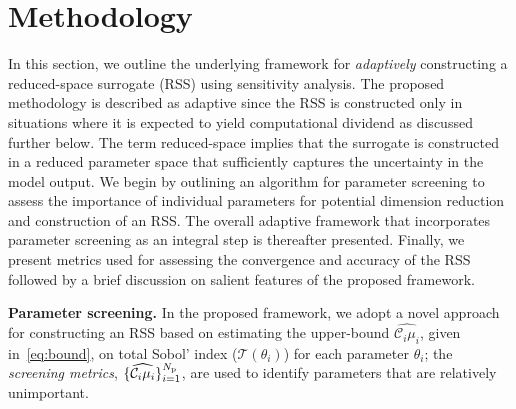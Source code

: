 \section{Methodology}
\label{sec:method}

%

In this section, we outline the underlying framework for \emph{adaptively}
constructing a reduced-space surrogate (RSS) using sensitivity analysis.  The
proposed methodology is described as adaptive since the RSS is constructed only
in situations where it is expected to yield computational dividend as discussed
further below.  The term reduced-space implies that the surrogate is
constructed in a reduced parameter space that sufficiently captures the uncertainty in the
model output. We begin by outlining an algorithm for parameter screening
to assess the importance of individual parameters for potential dimension
reduction and construction of an RSS. The overall adaptive framework 
that incorporates parameter screening as an integral step is thereafter
presented. Finally, we present metrics used for assessing the
convergence and accuracy of the RSS followed by a brief discussion on
salient features of the proposed framework. 

\textbf{Parameter screening.}
In the proposed framework, we
adopt a novel approach for constructing an RSS based on estimating the
upper-bound $\widehat{\mathcal{C}_i\mu_i}$, given in~\eqref{eq:bound}, on 
total Sobol' index ($\mathcal{T}(\theta_i)$) for each 
parameter $\theta_i$; the \emph{screening metrics}, 
$\{\widehat{\mathcal{C}_i\mu_i}\}_{i=1}^{N_\text{p}}$,  
are used to identify
parameters that are relatively unimportant. 

